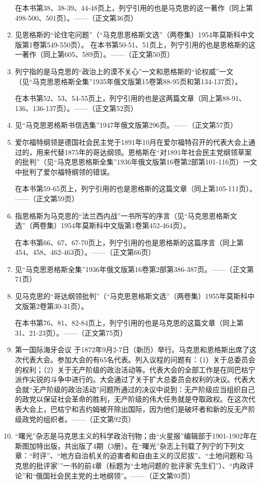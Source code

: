 \begin{enumerate}
		在本书第38、38-39、44-48页上，列宁引用的也是马克思的这一著作（同上第498-500、501页）。——（正文第36页）
	\item 见恩格斯的“论住宅问题”（“马克思恩格斯文选”（两卷集）1954年莫斯科中文版第1卷第549-550页）。
		在本书第50-51、51页上，列宁引用的也是恩格斯的这一著作（同上第605、589页）。——（正文第50页）
	\item 列宁指的是马克思的“政治上的漠不关心”一文和恩格斯的“论权威”一文（见“马克思恩格斯全集”1935年俄文版第15卷第88-95页和第134-137页）。
		
		在本书第52、53、54-55页上，列宁引用的也是这两篇文章（同上第88-91、136、136-137页）。——（正文第52页）
	\item 见“马克思恩格斯书信选集”1947年俄文版第296页。——（正文第57页）
	\item {\kaishu 爱尔福特纲领}是德国社会民主党于1891年10月在爱尔福特召开的代表大会上通过的，用来代替1875年的哥达纲领。恩格斯在“对1891年社会民主党纲领草案的批判”（见“马克思恩格斯全集”1936年俄文版第16卷第2部第101-116页）一文中批判了爱尔福特纲领的错误。
		
		在本书第59-65页上，列宁引用的也是恩格斯的这篇文章（同上第105-111页）。——（正文第59页）
	\item 指恩格斯为马克思的“法兰西内战”一书所写的序言（见“马克思恩格斯文选”（两卷集）1954年莫斯科中文版第1卷第452-464页）。
	
		在本书第66、67、67-70页上，列宁引用的也是恩格斯的这篇序言（同上第454、458、462-463页）。——（正文第66页）
	\item 见“马克思恩格斯全集”1936年俄文版第16卷第2部第386-387页。——（正文第71页）
	\item 见马克思的“哥达纲领批判”（“马克思恩格斯文选”（两卷集）1955年莫斯科中文版第2卷第30-31页）。
	
		在本书第76、81、82-84页上，列宁引用的也是马克思的这篇文章（同上第31、21-23页）。——（正文第75页）
	\item {\kaishu 第一国际海牙会议} 于1872年9月2-7日（新历）举行。马克思和恩格斯出席了这次代表大会。参加大会的有65名代表。列入议程的问题有：（1）关于总委员会的权利；（2）关于无产阶级的政治活动等。代表大会的全部工作是在同巴枯宁派作尖锐的斗争中进行的。大会通过了关于扩大总委员会权利的决议。代表大会就“无产阶级的政治活动”问题所通过的决议中说到：无产阶级应当组织自己的政党以保证社会革命的胜利，无产阶级的伟大任务就是夺取政权。在这次代表大会上，巴枯宁和吉约姆被开除出国际，因为他们是破坏者和新的反无产阶级政党的组织者。——（正文第92页）
	\item {\kaishu “曙光”}杂志是马克思主义的科学政治刊物；由“火星报”编辑部于1901-1902年在斯图加特出版，共出版了4期（3册）。在“曙光”杂志上刊载了列宁的下列文章：“时评”、“地方自治机关的迫害者和自由主义的汉尼拔”、“土地问题和‘马克思的批评家’”一书的前4章（标题为“土地问题的‘批评家’先生们”）、“内政评论”和“俄国社会民主党的土地纲领”。——（正文第93页）
	

\end{enumerate}
